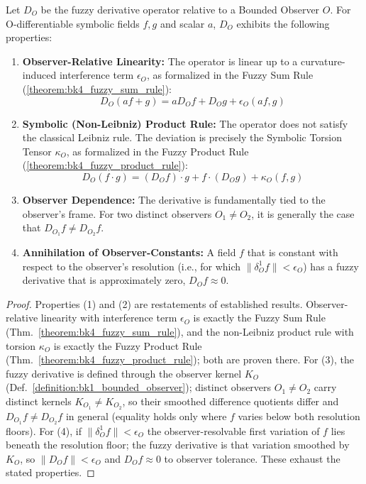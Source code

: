 \begin{proposition}\label{proposition:bk4_fuzzy_deriv_algebra}
Let $D_O$ be the fuzzy derivative operator relative to a Bounded Observer $O$. For O-differentiable symbolic fields $f, g$ and scalar $a$, $D_O$ exhibits the following properties:
\begin{enumerate}
    \item \textbf{Observer-Relative Linearity:} The operator is linear up to a curvature-induced interference term $\epsilon_O$, as formalized in the Fuzzy Sum Rule (\ref{theorem:bk4_fuzzy_sum_rule}):
    \begin{equation}
        D_O(af + g) = a D_O f + D_O g + \epsilon_O(af, g)
    \end{equation}
    \item \textbf{Symbolic (Non-Leibniz) Product Rule:} The operator does not satisfy the classical Leibniz rule. The deviation is precisely the Symbolic Torsion Tensor $\kappa_O$, as formalized in the Fuzzy Product Rule (\ref{theorem:bk4_fuzzy_product_rule}):
    \begin{equation}
        D_O(f \cdot g) = (D_O f) \cdot g + f \cdot (D_O g) + \kappa_O(f,g)
    \end{equation}
    \item \textbf{Observer Dependence:} The derivative is fundamentally tied to the observer's frame. For two distinct observers $O_1 \neq O_2$, it is generally the case that $D_{O_1} f \neq D_{O_2} f$.
    \item \textbf{Annihilation of Observer-Constants:} A field $f$ that is constant with respect to the observer's resolution (i.e., for which $\|\delta_O^1 f\| < \epsilon_O$) has a fuzzy derivative that is approximately zero, $D_O f \approx 0$.
\end{enumerate}
\end{proposition}

\begin{proof}
\label{proof:bk4_fuzzy_deriv_algebra}
\leavevmode
Properties (1) and (2) are restatements of established results. Observer-relative linearity with interference term $\epsilon_O$ is exactly the Fuzzy Sum Rule (Thm.~\ref{theorem:bk4_fuzzy_sum_rule}), and the non-Leibniz product rule with torsion $\kappa_O$ is exactly the Fuzzy Product Rule (Thm.~\ref{theorem:bk4_fuzzy_product_rule}); both are proven there. For (3), the fuzzy derivative is defined through the observer kernel $K_O$ (Def.~\ref{definition:bk1_bounded_observer}); distinct observers $O_1 \neq O_2$ carry distinct kernels $K_{O_1} \neq K_{O_2}$, so their smoothed difference quotients differ and $D_{O_1} f \neq D_{O_2} f$ in general (equality holds only where $f$ varies below both resolution floors). For (4), if $\|\delta_O^1 f\| < \epsilon_O$ the observer-resolvable first variation of $f$ lies beneath the resolution floor; the fuzzy derivative is that variation smoothed by $K_O$, so $\|D_O f\| < \epsilon_O$ and $D_O f \approx 0$ to observer tolerance. These exhaust the stated properties.
\end{proof}

